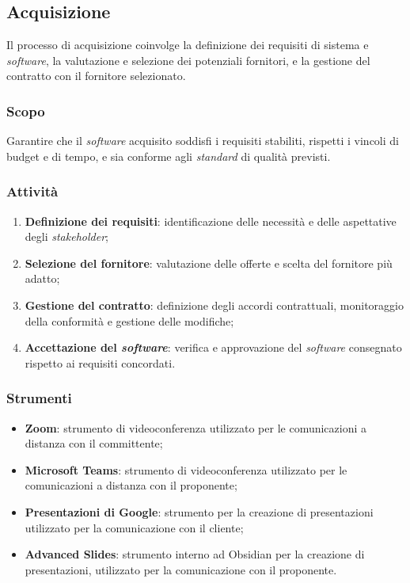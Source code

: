 \subsection{Acquisizione}

Il processo di acquisizione coinvolge la definizione dei requisiti di sistema e
\textit{software}, la valutazione e selezione dei potenziali fornitori, e la gestione del
contratto con il fornitore selezionato.

\subsubsection{Scopo}
Garantire che il \textit{software} acquisito soddisfi i requisiti stabiliti, rispetti i
vincoli di budget e di tempo, e sia conforme agli \textit{standard} di qualità previsti.

\subsubsection{Attività}
\begin{enumerate}
	\item \textbf{Definizione dei requisiti}: identificazione delle necessità e
	      delle aspettative degli \textit{stakeholder};
	\item \textbf{Selezione del fornitore}: valutazione delle offerte e scelta
	      del fornitore più adatto;
	\item \textbf{Gestione del contratto}: definizione degli accordi
	      contrattuali, monitoraggio della conformità e gestione delle
	      modifiche;
	\item \textbf{Accettazione del \textit{software}}: verifica e approvazione
	      del \textit{software} consegnato rispetto ai requisiti concordati.
\end{enumerate}

\subsubsection{Strumenti}
\begin{itemize}
	\item \textbf{Zoom}: strumento di videoconferenza utilizzato per le comunicazioni a distanza con il committente;
	\item \textbf{Microsoft Teams}: strumento di videoconferenza utilizzato per le comunicazioni a distanza con il proponente;
	\item \textbf{Presentazioni di Google}: strumento per la creazione di presentazioni utilizzato per la comunicazione con il cliente;
	\item \textbf{Advanced Slides}: strumento interno ad Obsidian per la creazione di presentazioni, utilizzato per la comunicazione con il proponente.
\end{itemize}
